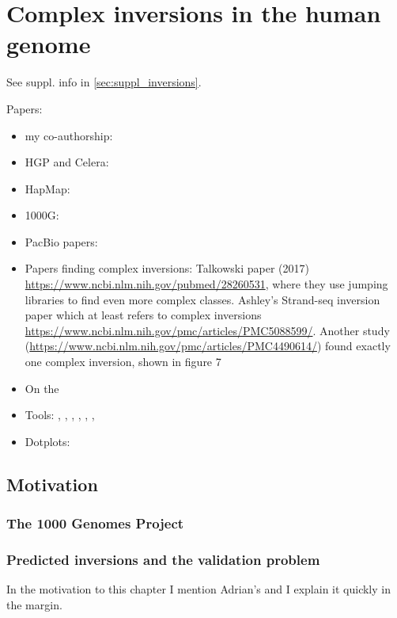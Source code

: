 \chapter{Complex inversions in the human genome}
\label{sec:complex_invs}

See suppl. info in \cref{sec:suppl_inversions}.

Papers:
\begin{itemize}
\item my co-authorship: \citep{Sudmant2015}
\item HGP and Celera: \citep{Lander2001,Venter2001}
\item HapMap: \citep{InternationalHapMapConsortium2005,Frazer2007,Altshuler2010}
\item 1000G: \citep{Durbin2010,1000GenomesProjectConsortium2012,Auton2015}
\item PacBio papers: \citep{Chaisson2014,Pendleton2015}
\item Papers finding complex inversions: Talkowski paper (2017)
    \url{https://www.ncbi.nlm.nih.gov/pubmed/28260531}, where they use jumping
    libraries to find even more complex classes. Ashley's Strand-seq inversion
    paper which at least refers to complex inversions
    \url{https://www.ncbi.nlm.nih.gov/pmc/articles/PMC5088599/}. Another study
    (\url{https://www.ncbi.nlm.nih.gov/pmc/articles/PMC4490614/}) found exactly
    one complex inversion, shown in figure 7
\item On the

\item Tools: \blasr, \last, \mummer, \bwamem, \quiver, \celeraassembler, \maze
\item Dotplots: \citep{Fitch1969,Gibbs1970}
\end{itemize}



\section{Motivation}
\subsection{The 1000 Genomes Project}
\subsection{Predicted inversions and the validation problem}

In the motivation to this chapter I mention Adrian's  and I explain it quickly in the margin.


